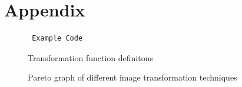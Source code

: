 \documentclass[11pt,a4paper]{article}
\begin{document}
\cite{eshraghian2023snntorch}



\appendix
\section{Appendix}


 





\begin{figure}[h]
\centering
\begin{lstlisting}
 Example Code
\end{lstlisting}
\caption{Transformation function definitons}
\label{fig:transformation_defs}
\end{figure}


\graphicspath{{images}}
\begin{figure}[H]
  \centering
  \caption{Pareto graph of different image transformation techniques}
  \label{fig:pareto_graph1}
\end{figure}



\end{document}
